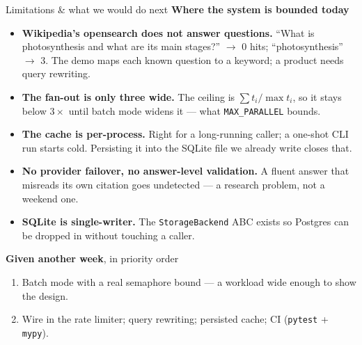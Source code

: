 \documentclass[aspectratio=169,11pt]{beamer}
\begin{document}
\begin{frame}{Limitations \& what we would do next}
  \small
  \textbf{Where the system is bounded today}
  \begin{itemize}\setlength\itemsep{0.15em}
    \item \textbf{Wikipedia's opensearch does not answer questions.} ``What is photosynthesis and
      what are its main stages?'' $\to$ 0 hits; ``photosynthesis'' $\to$ 3. The demo maps each
      known question to a keyword; a product needs query rewriting.
    \item \textbf{The fan-out is only three wide.} The ceiling is $\sum t_i / \max t_i$, so it
      stays below $3\times$ until batch mode widens it --- what \texttt{MAX\_PARALLEL} bounds.
    \item \textbf{The cache is per-process.} Right for a long-running caller; a one-shot CLI run
      starts cold. Persisting it into the SQLite file we already write closes that.
    \item \textbf{No provider failover, no answer-level validation.} A fluent answer that misreads
      its own citation goes undetected --- a research problem, not a weekend one.
    \item \textbf{SQLite is single-writer.} The \texttt{StorageBackend} ABC exists so Postgres can
      be dropped in without touching a caller.
  \end{itemize}

  \vspace{0.3em}
  \textbf{Given another week}, in priority order
  \begin{enumerate}\setlength\itemsep{0.1em}
    \item Batch mode with a real semaphore bound --- a workload wide enough to show the design.
    \item Wire in the rate limiter; query rewriting; persisted cache; CI (\texttt{pytest} + \texttt{mypy}).
  \end{enumerate}
\end{frame}
\end{document}
